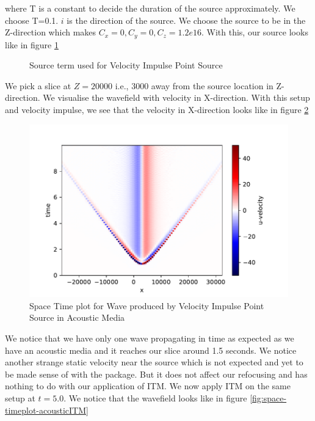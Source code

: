 where T is a constant to decide the duration of the source approximately. We choose T=0.1. $i$ is the direction of the source. 
We choose the source to be in the Z-direction which makes $C_x = 0, C_y = 0, C_z = 1.2e16$. With this, our source looks like in figure \ref{fig:source}

\begin{figure}
    \centering
    \caption{Source term used for Velocity Impulse Point Source}
    \label{fig:source}
\end{figure}

We pick a slice at $Z=20000$ i.e., 3000 away from the source location in Z-direction.
We visualise the wavefield with velocity in X-direction. With this setup and velocity impulse, we see that the velocity in X-direction
looks like in figure \ref{fig:space-timeplot-acousticnoITM}

\begin{figure}
    \centering
    \includegraphics[width=0.75\linewidth]{figures/Acoustic-noITM.pdf}
    \caption{Space Time plot for Wave produced by Velocity Impulse Point Source in Acoustic Media}
    \label{fig:space-timeplot-acousticnoITM}
\end{figure}

We notice that we have only one wave propagating in time as expected as we have an acoustic media and it reaches our slice around 1.5 seconds. We notice another 
strange static velocity near the source which is not expected and yet to be made sense of with the package. But it does not affect our refocusing and has nothing to do with
our application of \ac{ITM}. We now apply ITM on the same setup at $t=5.0$. We notice that the wavefield looks like in figure \ref{fig:space-timeplot-acousticITM}

